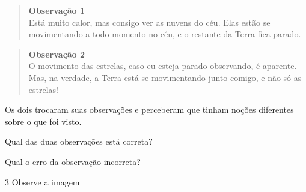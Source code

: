 \begin{quote}
\textbf{Observação 1}\\
Está muito calor, mas consigo ver as nuvens
do céu. Elas estão se movimentando a todo momento no céu, e o restante
da Terra fica parado.
\end{quote}

\begin{quote}
\textbf{Observação 2}\\
O movimento das estrelas, caso eu esteja
parado observando, é aparente. Mas, na verdade, a Terra está se
movimentando junto comigo, e não só as estrelas!
\end{quote}

Os dois trocaram suas observações e perceberam que tinham noções
diferentes sobre o que foi visto.

\begin{escolha}
\item Qual das duas observações está correta?


\item Qual o erro da observação incorreta?

\end{escolha}

\num{3} Observe a imagem


